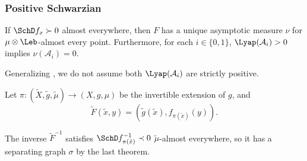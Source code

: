 \documentclass[shortlabels, 9pt, aspectratio=2013]{beamer}
\begin{document}
  
\newcommand{\ex}{\tilde x}
\newcommand{\eX}{\tilde X}
\newcommand{\emu}{\tilde \mu}
\newcommand{\enu}{\tilde \nu}
\newcommand{\eg}{\tilde g}
\newcommand{\eF}{\tilde F}
\newcommand{\ef}{\tilde f}
\newcommand{\eAu}{\tilde\mathcal{A}_1}
\newcommand{\eAl}{\tilde\mathcal{A}_0}
\newcommand{\eBu}{\tilde{\mathcal{B}}_1}
\newcommand{\eBl}{\tilde{\mathcal{B}}_0}

\begin{frame}
  \frametitle{Positive Schwarzian}
  \begin{theorem}\label{thm:pos-schwarz-asymptotic}
    If \(\SchD f_x \succ 0\) almost everywhere, then \(F\) has a unique asymptotic measure \(\nu\) for \(\mu \otimes \Leb\)-almost every point. Furthermore, for each \(i \in \{ 0,1 \}\), \(\Lyap(\mathcal{A}_i) > 0\) implies \(\nu(\mathcal{A}_i) = 0\).
  \end{theorem}
  Generalizing \textcite[Lemma 5.4]{bonifantSchwarzianDerivativesCylinder2008}, we do not assume both \(\Lyap(\mathcal{A}_i)\) are strictly positive.
  \begin{proofs}
    Let \(\pi \colon (\eX, \eg, \emu) \to (X, g, \mu)\) be the invertible extension of \(g\), and 
    \begin{equation*}
      \eF(\ex, y) = (\eg(\ex), f_{\pi(\ex)}(y)).
    \end{equation*}
    
    The inverse \(\tilde{F}^{-1}\) satisfies \(\SchD f_{\pi(\ex)}^{-1} \prec 0\) \(\tilde \mu\)-almost everywhere, so it has a separating graph \(\sigma\) by the last theorem.
  \end{proofs}

\end{frame}
\end{document}
